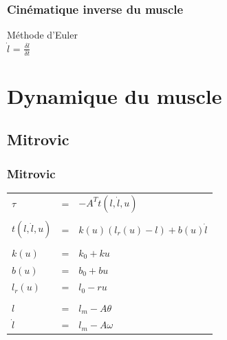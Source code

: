 \documentclass{beamer}
\begin{document}
\begin{frame}
\frametitle{Cinématique inverse du muscle}
Méthode d'Euler\\
$\dot{l}$ = $\frac{\delta l}{\delta t}$ \\
\end{frame}
    

\section{Dynamique du muscle}

\subsection{Mitrovic}

\begin{frame}
\frametitle{Mitrovic}
\begin{tabular}{lcl}
    $\tau$ & = & $-A^T t(l, \dot{l}, u)$ \\
    & & \\
    $t(l, \dot{l}, u)$        & = & $k(u) (l_r(u) - l) + b(u) \dot{l}$ \\
    & & \\
    $k(u)$    & = & $k_0 + k u$ \\
    $b(u)$    & = & $b_0 + b u$ \\
    $l_r(u)$  & = & $l_0 - r u$ \\
    & & \\
    $l$       & = & $l_m - A \theta $ \\
    $\dot{l}$ & = & $l_m - A \omega $ \\
\end{tabular}
\end{frame}
\end{document}
